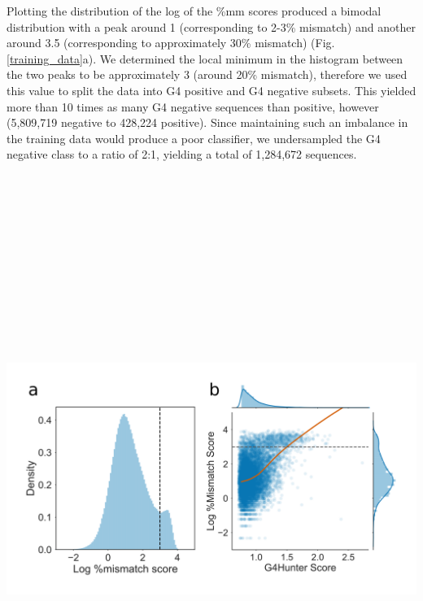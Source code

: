 \documentclass[12pt,a4paper,]{report}
\let\origfigure=\figure
\let\endorigfigure=\endfigure
\renewenvironment{figure}[1][2] {
    \expandafter\origfigure\expandafter[H]
} {
    \endorigfigure
}
\begin{document}
Plotting the distribution of the log of the \%mm scores produced a
bimodal distribution with a peak around 1 (corresponding to 2-3\%
mismatch) and another around 3.5 (corresponding to approximately 30\%
mismatch) (Fig. \ref{training_data}a). We determined the local minimum
in the histogram between the two peaks to be approximately 3 (around
20\% mismatch), therefore we used this value to split the data into G4
positive and G4 negative subsets. This yielded more than 10 times as
many G4 negative sequences than positive, however (5,809,719 negative to
428,224 positive). Since maintaining such an imbalance in the training
data would produce a poor classifier, we undersampled the G4 negative
class to a ratio of 2:1, yielding a total of 1,284,672 sequences.

\newpage

\begin{figure}[htbp]
\centering
\includegraphics[width=\textwidth,height=562pt,keepaspectratio]{chapter_3/figures/training_data_dist.png}

\end{figure}
\end{document}
